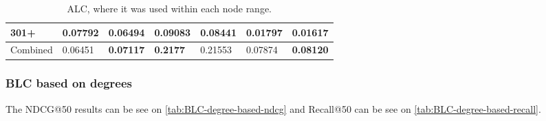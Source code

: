 \begin{table*}[h!]
\begin{tabular}{|l|l|l||l|l||l|l|}
        301+      & \textbf{0.07792}                        & 0.06494                        & \textbf{0.09083}                 & 0.08441          & \textbf{0.01797} & 0.01617          \\ \hline
        Combined  & 0.06451                                 & \textbf{0.07117}               & \textbf{0.2177 }                 & 0.21553          & 0.07874          & \textbf{0.08120} \\ \hline
    \end{tabular}
    \caption{ALC, where it was used within each node range.}
    \label{tab:ALC-degree-based-recall}
\end{table*}

\subsubsection{BLC based on degrees}
The NDCG@50 results can be see on \autoref{tab:BLC-degree-based-ndcg} and Recall@50 can be see on \autoref{tab:BLC-degree-based-recall}.

